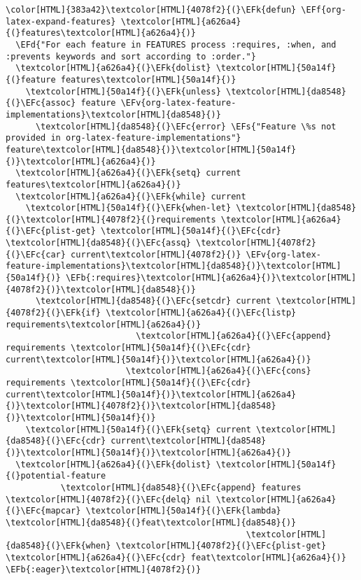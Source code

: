 \documentclass{scrartcl}
\newcommand{\EFk}[1]{\textcolor{EFk}{#1}} %
\newcommand{\EFd}[1]{\textcolor{EFd}{\textit{#1}}} %
\newcommand{\EFs}[1]{\textcolor{EFs}{#1}} %
\newcommand{\EFb}[1]{\textcolor{EFb}{#1}} %
\newcommand{\EFc}[1]{\textcolor{EFc}{#1}} %
\newcommand{\EFv}[1]{\textcolor{EFv}{#1}} %
\newcommand{\EFf}[1]{\textcolor{EFf}{#1}} %
\begin{document}
\begin{enumerate}
\begin{Code}
\begin{Verbatim}[]
\color[HTML]{383a42}\textcolor[HTML]{4078f2}{(}\EFk{defun} \EFf{org-latex-expand-features} \textcolor[HTML]{a626a4}{(}features\textcolor[HTML]{a626a4}{)}
  \EFd{"For each feature in FEATURES process :requires, :when, and :prevents keywords and sort according to :order."}
  \textcolor[HTML]{a626a4}{(}\EFk{dolist} \textcolor[HTML]{50a14f}{(}feature features\textcolor[HTML]{50a14f}{)}
    \textcolor[HTML]{50a14f}{(}\EFk{unless} \textcolor[HTML]{da8548}{(}\EFc{assoc} feature \EFv{org-latex-feature-implementations}\textcolor[HTML]{da8548}{)}
      \textcolor[HTML]{da8548}{(}\EFc{error} \EFs{"Feature \%s not provided in org-latex-feature-implementations"} feature\textcolor[HTML]{da8548}{)}\textcolor[HTML]{50a14f}{)}\textcolor[HTML]{a626a4}{)}
  \textcolor[HTML]{a626a4}{(}\EFk{setq} current features\textcolor[HTML]{a626a4}{)}
  \textcolor[HTML]{a626a4}{(}\EFk{while} current
    \textcolor[HTML]{50a14f}{(}\EFk{when-let} \textcolor[HTML]{da8548}{(}\textcolor[HTML]{4078f2}{(}requirements \textcolor[HTML]{a626a4}{(}\EFc{plist-get} \textcolor[HTML]{50a14f}{(}\EFc{cdr} \textcolor[HTML]{da8548}{(}\EFc{assq} \textcolor[HTML]{4078f2}{(}\EFc{car} current\textcolor[HTML]{4078f2}{)} \EFv{org-latex-feature-implementations}\textcolor[HTML]{da8548}{)}\textcolor[HTML]{50a14f}{)} \EFb{:requires}\textcolor[HTML]{a626a4}{)}\textcolor[HTML]{4078f2}{)}\textcolor[HTML]{da8548}{)}
      \textcolor[HTML]{da8548}{(}\EFc{setcdr} current \textcolor[HTML]{4078f2}{(}\EFk{if} \textcolor[HTML]{a626a4}{(}\EFc{listp} requirements\textcolor[HTML]{a626a4}{)}
                          \textcolor[HTML]{a626a4}{(}\EFc{append} requirements \textcolor[HTML]{50a14f}{(}\EFc{cdr} current\textcolor[HTML]{50a14f}{)}\textcolor[HTML]{a626a4}{)}
                        \textcolor[HTML]{a626a4}{(}\EFc{cons} requirements \textcolor[HTML]{50a14f}{(}\EFc{cdr} current\textcolor[HTML]{50a14f}{)}\textcolor[HTML]{a626a4}{)}\textcolor[HTML]{4078f2}{)}\textcolor[HTML]{da8548}{)}\textcolor[HTML]{50a14f}{)}
    \textcolor[HTML]{50a14f}{(}\EFk{setq} current \textcolor[HTML]{da8548}{(}\EFc{cdr} current\textcolor[HTML]{da8548}{)}\textcolor[HTML]{50a14f}{)}\textcolor[HTML]{a626a4}{)}
  \textcolor[HTML]{a626a4}{(}\EFk{dolist} \textcolor[HTML]{50a14f}{(}potential-feature
           \textcolor[HTML]{da8548}{(}\EFc{append} features \textcolor[HTML]{4078f2}{(}\EFc{delq} nil \textcolor[HTML]{a626a4}{(}\EFc{mapcar} \textcolor[HTML]{50a14f}{(}\EFk{lambda} \textcolor[HTML]{da8548}{(}feat\textcolor[HTML]{da8548}{)}
                                                \textcolor[HTML]{da8548}{(}\EFk{when} \textcolor[HTML]{4078f2}{(}\EFc{plist-get} \textcolor[HTML]{a626a4}{(}\EFc{cdr} feat\textcolor[HTML]{a626a4}{)} \EFb{:eager}\textcolor[HTML]{4078f2}{)}

\end{Verbatim}
\end{Code}
\end{enumerate}
\end{document}
